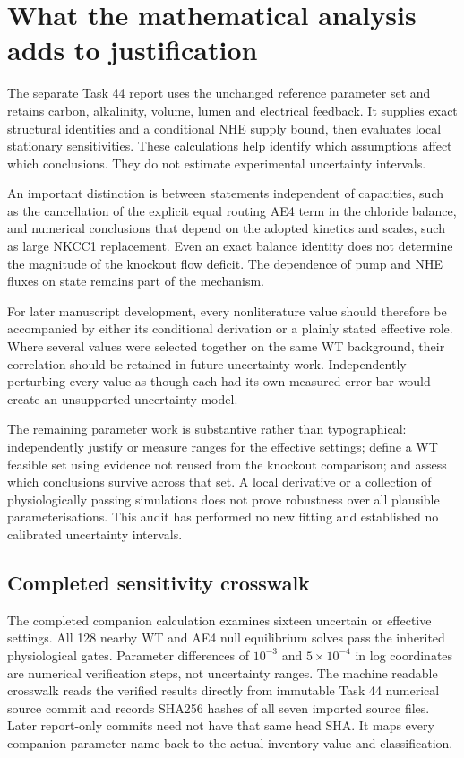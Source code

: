 \section{What the mathematical analysis adds to justification}
The separate Task 44 report uses the unchanged reference parameter set and retains carbon, alkalinity, volume, lumen and electrical feedback. It supplies exact structural identities and a conditional NHE supply bound, then evaluates local stationary sensitivities. These calculations help identify which assumptions affect which conclusions. They do not estimate experimental uncertainty intervals.

An important distinction is between statements independent of capacities, such as the cancellation of the explicit equal routing AE4 term in the chloride balance, and numerical conclusions that depend on the adopted kinetics and scales, such as large NKCC1 replacement. Even an exact balance identity does not determine the magnitude of the knockout flow deficit. The dependence of pump and NHE fluxes on state remains part of the mechanism.

For later manuscript development, every nonliterature value should therefore be accompanied by either its conditional derivation or a plainly stated effective role. Where several values were selected together on the same WT background, their correlation should be retained in future uncertainty work. Independently perturbing every value as though each had its own measured error bar would create an unsupported uncertainty model.

The remaining parameter work is substantive rather than typographical: independently justify or measure ranges for the effective settings; define a WT feasible set using evidence not reused from the knockout comparison; and assess which conclusions survive across that set. A local derivative or a collection of physiologically passing simulations does not prove robustness over all plausible parameterisations. This audit has performed no new fitting and established no calibrated uncertainty intervals.

\subsection{Completed sensitivity crosswalk}
The completed companion calculation examines sixteen uncertain or effective settings. All 128 nearby WT and AE4 null equilibrium solves pass the inherited physiological gates. Parameter differences of $10^{-3}$ and $5\times10^{-4}$ in log coordinates are numerical verification steps, not uncertainty ranges. The machine readable crosswalk reads the verified results directly from immutable Task 44 numerical source commit \texttt{\SensitivitySourceCommit} and records SHA256 hashes of all seven imported source files. Later report-only commits need not have that same head SHA. It maps every companion parameter name back to the actual inventory value and classification.


